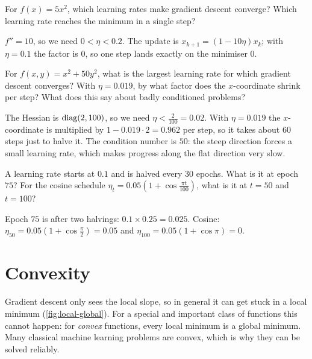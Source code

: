 \sectionexercises

\begin{exercise}
For $f(x) = 5x^2$, which learning rates make gradient descent converge? Which
learning rate reaches the minimum in a single step?
\end{exercise}
\begin{solution}
$f'' = 10$, so we need $0 < \eta < 0.2$. The update is
$x_{k+1} = (1 - 10\eta)x_k$; with $\eta = 0.1$ the factor is $0$, so one step
lands exactly on the minimiser $0$.
\end{solution}

\begin{exercise}
For $f(x, y) = x^2 + 50y^2$, what is the largest learning rate for which
gradient descent converges? With $\eta = 0.019$, by what factor does the
$x$-coordinate shrink per step? What does this say about badly conditioned
problems?
\end{exercise}
\begin{solution}
The Hessian is $\operatorname{diag}(2, 100)$, so we need $\eta < \tfrac{2}{100} = 0.02$. With
$\eta = 0.019$ the $x$-coordinate is multiplied by $1 - 0.019\cdot2 = 0.962$ per
step, so it takes about $60$ steps just to halve it. The condition number is
$50$: the steep direction forces a small learning rate, which makes progress
along the flat direction very slow.
\end{solution}

\begin{exercise}
A learning rate starts at $0.1$ and is halved every $30$ epochs. What is it at
epoch $75$? For the cosine schedule $\eta_t = 0.05\left(1 + \cos\frac{\pi t}{100}
\right)$, what is it at $t = 50$ and $t = 100$?
\end{exercise}
\begin{solution}
Epoch $75$ is after two halvings: $0.1\times0.25 = 0.025$. Cosine:
$\eta_{50} = 0.05(1 + \cos\tfrac\pi2) = 0.05$ and
$\eta_{100} = 0.05(1 + \cos\pi) = 0$.
\end{solution}

\section{Convexity}\label{sec:convexity}

\begin{motivation}
Gradient descent only sees the local slope, so in general it can get stuck in
a local minimum (\cref{fig:local-global}). For a special and important class of
functions this cannot happen: for \emph{convex} functions, every local minimum
is a global minimum. Many classical machine learning problems are convex,
which is why they can be solved reliably.
\end{motivation}

